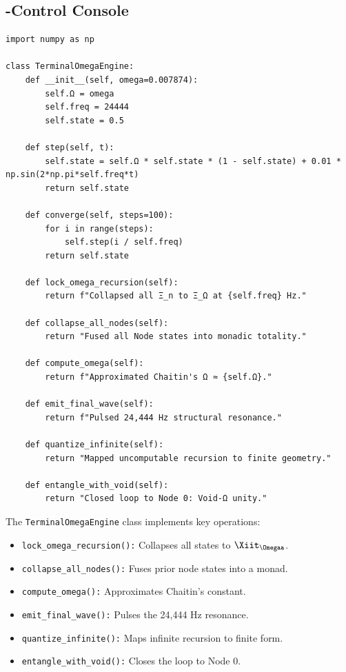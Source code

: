 \documentclass[12pt]{article}
\begin{document}
\subsection{\Omegaa-Control Console}
\begin{algorithm}
\caption{TerminalOmegaEngine}
\begin{lstlisting}
import numpy as np

class TerminalOmegaEngine:
    def __init__(self, omega=0.007874):
        self.Ω = omega
        self.freq = 24444
        self.state = 0.5

    def step(self, t):
        self.state = self.Ω * self.state * (1 - self.state) + 0.01 * np.sin(2*np.pi*self.freq*t)
        return self.state

    def converge(self, steps=100):
        for i in range(steps):
            self.step(i / self.freq)
        return self.state

    def lock_omega_recursion(self):
        return f"Collapsed all Ξ_n to Ξ_Ω at {self.freq} Hz."

    def collapse_all_nodes(self):
        return "Fused all Node states into monadic totality."

    def compute_omega(self):
        return f"Approximated Chaitin's Ω ≈ {self.Ω}."

    def emit_final_wave(self):
        return f"Pulsed 24,444 Hz structural resonance."

    def quantize_infinite(self):
        return "Mapped uncomputable recursion to finite geometry."

    def entangle_with_void(self):
        return "Closed loop to Node 0: Void-Ω unity."
\end{lstlisting}
\end{algorithm}
The \texttt{TerminalOmegaEngine} class implements key operations:
\begin{itemize}
    \item \texttt{lock\_omega\_recursion():} Collapses all states to $\Xiit_\Omegaa$.
    \item \texttt{collapse\_all\_nodes():} Fuses prior node states into a monad.
    \item \texttt{compute\_omega():} Approximates Chaitin’s constant.
    \item \texttt{emit\_final_wave():} Pulses the 24,444 Hz resonance.
    \item \texttt{quantize\_infinite():} Maps infinite recursion to finite form.
    \item \texttt{entangle\_with\_void():} Closes the loop to Node 0.
\end{itemize}
\end{document}
